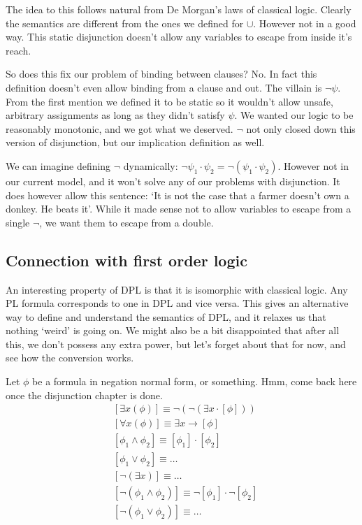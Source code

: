 \documentclass[12pt]{article}
\begin{document}
The idea to this follows natural from De Morgan's laws of classical logic. Clearly the semantics are different from the ones we defined for $\cup$. However not in a good way. This static disjunction doesn't allow any variables to escape from inside it's reach.

So does this fix our problem of binding between clauses? No. In fact this definition doesn't even allow binding from a clause and out. The villain is $\neg\psi$. From the first mention we defined it to be static so it wouldn't allow unsafe, arbitrary assignments as long as they didn't satisfy $\psi$. We wanted our logic to be reasonably monotonic, and we got what we deserved. $\neg$ not only closed down this version of disjunction, but our implication definition as well.

We can imagine defining $\neg$ dynamically: $\neg\psi_1\cdot\psi_2 = \neg(\psi_1\cdot\psi_2)$. However not in our current model, and it won't solve any of our problems with disjunction. It does however allow this sentence: `It is not the case that a farmer doesn't own a donkey. He beats it'. While it made sense not to allow variables to escape from a single $\neg$, we want them to escape from a double.

\subsection{Connection with first order logic}

An interesting property of DPL is that it is isomorphic with classical logic. Any PL formula corresponds to one in DPL and vice versa. This gives an alternative way to define and understand the semantics of DPL, and it relaxes us that nothing `weird' is going on. We might also be a bit disappointed that after all this, we don't possess any extra power, but let's forget about that for now, and see how the conversion works.

Let $\phi$ be a formula in negation normal form, or something. Hmm, come back here once the disjunction chapter is done.
\begin{align}
&[\exists x(\phi)] \equiv \neg(\neg(\exists x \cdot [\phi]))\\
&[\forall x(\phi)] \equiv \exists x \rightarrow [\phi]\\
&[\phi_1\wedge\phi_2] \equiv [\phi_1]\cdot[\phi_2]\\
&[\phi_1\vee\phi_2] \equiv \dots\\
&[\neg(\exists x)] \equiv \dots\\
&[\neg(\phi_1\wedge\phi_2)] \equiv \neg[\phi_1]\cdot\neg[\phi_2]\\
&[\neg(\phi_1\vee\phi_2)] \equiv \dots
\end{align}
\end{document}
